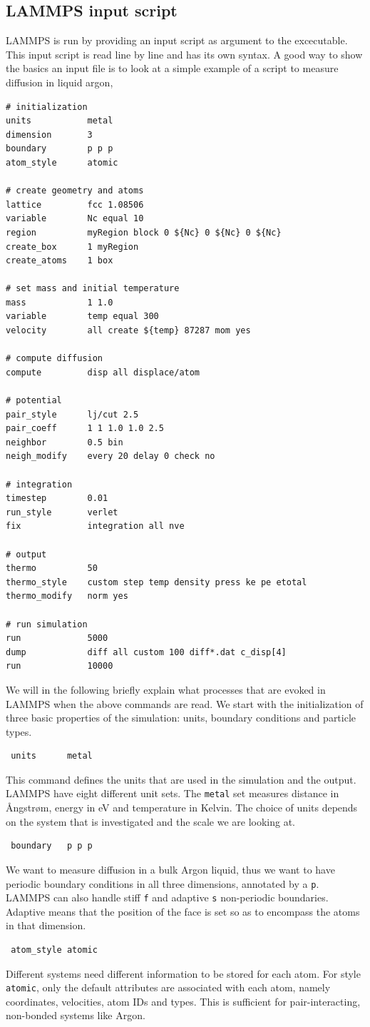 \documentclass[twoside,english]{uiofysmaster}
\begin{document}
\subsection{LAMMPS input script}
LAMMPS is run by providing an input script as 
argument to the excecutable. This input script
is read line by line and has its own syntax. 
A good way to show the basics an input file
is to look at a simple example of a script
to measure diffusion in liquid argon,
\begin{lstlisting}
# initialization
units 			metal		
dimension 		3
boundary		p p p		
atom_style		atomic		

# create geometry and atoms
lattice 		fcc 1.08506
variable		Nc equal 10
region 			myRegion block 0 ${Nc} 0 ${Nc} 0 ${Nc}
create_box		1 myRegion
create_atoms	1 box

# set mass and initial temperature
mass			1 1.0
variable		temp equal 300
velocity		all create ${temp} 87287 mom yes 

# compute diffusion
compute 		disp all displace/atom

# potential 
pair_style		lj/cut 2.5
pair_coeff		1 1 1.0 1.0 2.5
neighbor		0.5 bin
neigh_modify	every 20 delay 0 check no

# integration
timestep 		0.01
run_style 		verlet
fix 			integration all nve

# output
thermo			50
thermo_style 	custom step temp density press ke pe etotal 
thermo_modify 	norm yes

# run simulation
run				5000
dump 			diff all custom 100 diff*.dat c_disp[4]
run				10000
\end{lstlisting}
We will in the following briefly explain what
processes that are evoked in LAMMPS when the 
above commands are read. We start with the initialization of 
three basic properties of the simulation: units, boundary conditions and particle types.
\begin{lstlisting}
 units 		metal
\end{lstlisting}
This command defines the units that are used 
in the simulation and the output. LAMMPS have eight
different unit sets. The \texttt{metal} set measures
distance in \AA{}ngstr\o{}m, energy in eV and temperature
in Kelvin. The choice of units depends on the system
that is investigated and the scale we are looking at.
\begin{lstlisting}
 boundary 	p p p
\end{lstlisting}
We want to measure diffusion in a bulk
Argon liquid, thus we want to have periodic 
boundary conditions in all three dimensions, 
annotated by a \texttt{p}. LAMMPS can also handle stiff \texttt{f}
and adaptive \texttt{s} non-periodic boundaries. Adaptive
means that the position of the face is set so as to
encompass the atoms in that dimension. 
\begin{lstlisting}
 atom_style atomic
\end{lstlisting}
Different systems need different information
to be stored for each atom. For style \texttt{atomic}, only
the default attributes are associated with each atom, 
namely coordinates, velocities, atom IDs and types. 
This is sufficient for pair-interacting, non-bonded
systems like Argon.
\end{document}
